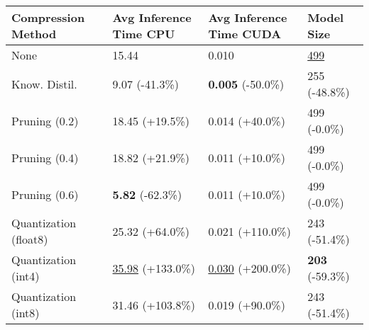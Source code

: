 \begin{tabular}{llll}
\toprule
\textbf{Compression Method} & \textbf{Avg Inference Time CPU} & \textbf{Avg Inference Time CUDA} & \textbf{Model Size} \\
\midrule
None & 15.44 & 0.010 & \underline{499} \\
Know. Distil. & 9.07 (-41.3\%) & \textbf{0.005} (-50.0\%) & 255 (-48.8\%) \\
Pruning (0.2) & 18.45 (+19.5\%) & 0.014 (+40.0\%) & 499 (-0.0\%) \\
Pruning (0.4) & 18.82 (+21.9\%) & 0.011 (+10.0\%) & 499 (-0.0\%) \\
Pruning (0.6) & \textbf{5.82} (-62.3\%) & 0.011 (+10.0\%) & 499 (-0.0\%) \\
Quantization (float8) & 25.32 (+64.0\%) & 0.021 (+110.0\%) & 243 (-51.4\%) \\
Quantization (int4) & \underline{35.98} (+133.0\%) & \underline{0.030} (+200.0\%) & \textbf{203} (-59.3\%) \\
Quantization (int8) & 31.46 (+103.8\%) & 0.019 (+90.0\%) & 243 (-51.4\%) \\
\bottomrule
\end{tabular}
